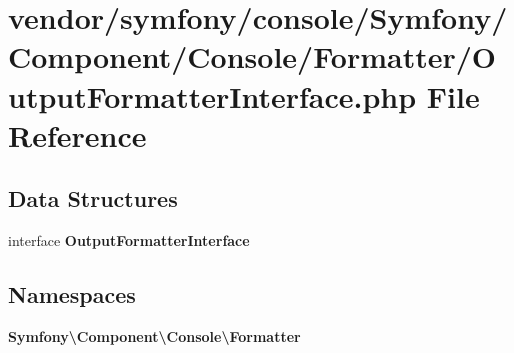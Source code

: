\section{vendor/symfony/console/\+Symfony/\+Component/\+Console/\+Formatter/\+Output\+Formatter\+Interface.php File Reference}
\label{_output_formatter_interface_8php}
\subsection*{Data Structures}
\begin{DoxyCompactItemize}
\item 
interface {\bf Output\+Formatter\+Interface}
\end{DoxyCompactItemize}
\subsection*{Namespaces}
\begin{DoxyCompactItemize}
\item 
 {\bf Symfony\textbackslash{}\+Component\textbackslash{}\+Console\textbackslash{}\+Formatter}
\end{DoxyCompactItemize}
